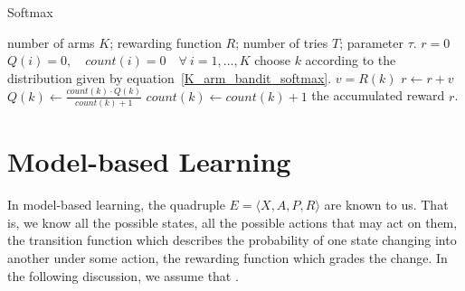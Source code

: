 \begin{algorithm}
    \caption{Softmax}\label{Softmax_for_K_arm_bandit}
    \begin{algorithmic}[1]
        \Require number of arms $K$; rewarding function $R$; number of tries $T$; parameter $\tau$.
        \State $r = 0$
        \State $Q(i) = 0, \quad count(i) = 0\quad\forall~i=1,\ldots, K$
            \State choose $k$ according to the distribution given by equation~\eqref{K_arm_bandit_softmax}.
            \State $v = R(k)$
            \State $r \gets r + v$
            \State $Q(k) \gets \frac{count(k)\cdot Q(k)}{count(k) + 1}$
            \State $count(k) \gets count(k) + 1$
        \EndFor
        \Ensure the accumulated reward $r$.
    \end{algorithmic}
\end{algorithm}


\newpage
\section{Model-based Learning}
In model-based learning, the quadruple $E = \langle X, A, P, R\rangle$ are known to us. That is, we know all
the possible states, all the possible actions that may act on them, the transition function which describes
the probability of one state changing into another under some action, the rewarding function which grades the
change. In the following discussion, we assume that .

